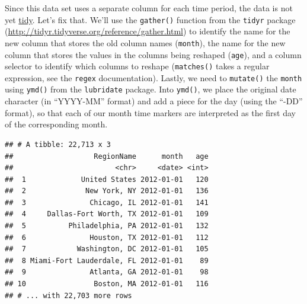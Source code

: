 \documentclass[]{book}
\newenvironment{Shaded}{\begin{snugshade}}{\end{snugshade}}
\newcommand{\KeywordTok}[1]{\textcolor[rgb]{0.13,0.29,0.53}{\textbf{{#1}}}}
\newcommand{\DataTypeTok}[1]{\textcolor[rgb]{0.13,0.29,0.53}{{#1}}}
\newcommand{\StringTok}[1]{\textcolor[rgb]{0.31,0.60,0.02}{{#1}}}
\newcommand{\OtherTok}[1]{\textcolor[rgb]{0.56,0.35,0.01}{{#1}}}
\newcommand{\NormalTok}[1]{{#1}}
\theoremstyle{definition}
\theoremstyle{definition}
\theoremstyle{remark}
\begin{document}
Since this data set uses a separate column for each time period, the
data is not yet
\href{https://cran.r-project.org/web/packages/tidyr/vignettes/tidy-data.html}{tidy}.
Let's fix that. We'll use the \texttt{gather()} function from the
\texttt{tidyr} package
(\url{http://tidyr.tidyverse.org/reference/gather.html}) to identify the
name for the new column that stores the old column names
(\texttt{month}), the name for the new column that stores the values in
the columns being reshaped (\texttt{age}), and a column selector to
identify which columns to reshape (\texttt{matches()} takes a regular
expression, see the \texttt{regex} documentation). Lastly, we need to
\texttt{mutate()} the \texttt{month} using \texttt{ymd()} from the
\texttt{lubridate} package. Into \texttt{ymd()}, we place the original
date character (in ``YYYY-MM'' format) and add a piece for the day
(using the ``-DD'' format), so that each of our month time markers are
interpreted as the first day of the corresponding month.

\begin{Shaded}
\end{Shaded}

\begin{verbatim}
## # A tibble: 22,713 x 3
##                   RegionName      month   age
##                        <chr>     <date> <int>
##  1             United States 2012-01-01   120
##  2              New York, NY 2012-01-01   136
##  3               Chicago, IL 2012-01-01   141
##  4     Dallas-Fort Worth, TX 2012-01-01   109
##  5          Philadelphia, PA 2012-01-01   132
##  6               Houston, TX 2012-01-01   112
##  7            Washington, DC 2012-01-01   105
##  8 Miami-Fort Lauderdale, FL 2012-01-01    89
##  9               Atlanta, GA 2012-01-01    98
## 10                Boston, MA 2012-01-01   116
## # ... with 22,703 more rows
\end{verbatim}
\end{document}
